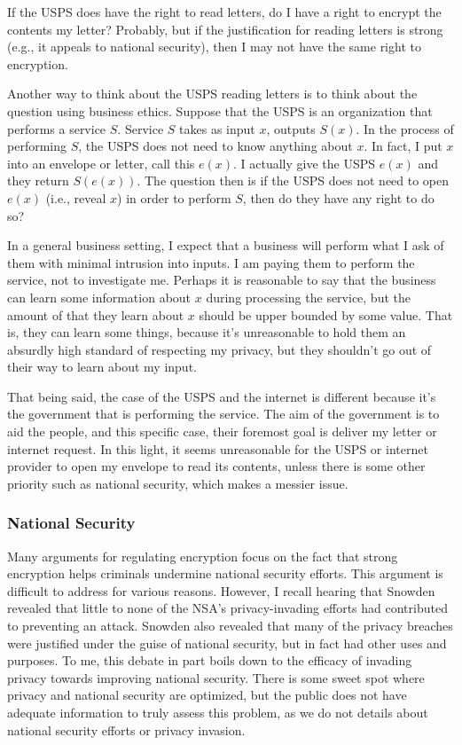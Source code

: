 \documentclass[11pt]{article}
\begin{document}
If the USPS does have the right to read letters, do I have a right to encrypt the contents my letter?
Probably, but if the justification for reading letters is strong (e.g., it appeals to national security), then I may not have the same right to encryption.

Another way to think about the USPS reading letters is to think about the question using business ethics.
Suppose that the USPS is an organization  that performs a service $S$.
Service $S$ takes as input $x$, outputs $S(x)$.
In the process of performing $S$, the USPS does not need to know anything about $x$.
In fact, I put $x$ into an envelope or letter, call this $e(x)$.
I actually give the USPS $e(x)$ and they return $S(e(x))$.
The question then is if the USPS does not need to open $e(x)$ (i.e., reveal $x$) in order to perform $S$, then do they have any right to do so?

In a general business setting, I expect that a business will perform what I ask of them with minimal intrusion into inputs.
I am paying them to perform the service, not to investigate me.
Perhaps it is reasonable to say that the business can learn some information about $x$ during processing the service, but the amount of that they learn about $x$ should be upper bounded by some value.
That is, they can learn some things, because it's unreasonable to hold them an absurdly high standard of respecting my privacy, but they shouldn't go out of their way to learn about my input.

That being said, the case of the USPS and the internet is different because it's the government that is performing the service.
The aim of the government is to aid the people, and this specific case, their foremost goal is deliver my letter or internet request.
In this light, it seems unreasonable for the USPS or internet provider to open my envelope to read its contents, unless there is some other priority such as national security, which makes a messier issue.

\subsubsection{National Security}
Many arguments for regulating encryption focus on the fact that strong encryption helps criminals undermine national security efforts.
This argument is difficult to address for various reasons.
However, I recall hearing that Snowden revealed that little to none of the NSA's privacy-invading efforts had contributed to preventing an attack.
Snowden also revealed that many of the privacy breaches were justified under the guise of national security, but in fact had other uses and purposes.
To me, this debate in part boils down to the efficacy of invading privacy towards improving national security.
There is some sweet spot where privacy and national security are optimized, but the public does not have adequate information to truly assess this problem, as we do not details about national security efforts or privacy invasion.
\end{document}
